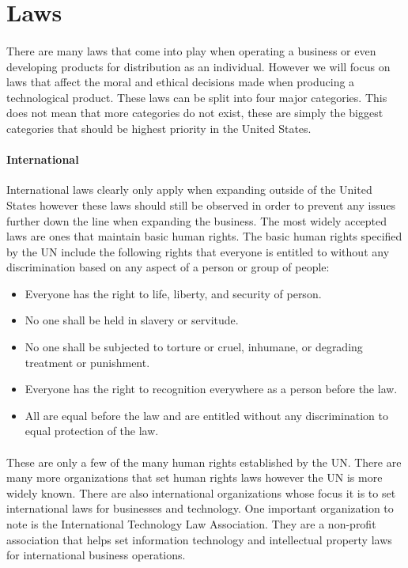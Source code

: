 \documentclass[notitlepage,a4paper,12pt]{article}
\begin{document}
\section*{Laws}
\paragraph{}There are many laws that come into play when operating a business or even developing products for distribution as an individual. However we will focus on laws that affect the moral and ethical decisions made when producing a technological product. These laws can be split into four major categories. This does not mean that more categories do not exist, these are simply the biggest categories that should be highest priority in the United States.
\paragraph{International}International laws clearly only apply when expanding outside of the United States however these laws should still be observed in order to prevent any issues further down the line when expanding the business. The most widely accepted laws are ones that maintain basic human rights. The basic human rights specified by the UN include the following rights that everyone is entitled to without any discrimination based on any aspect of a person or group of people:
	\begin{itemize}
	\item Everyone has the right to life, liberty, and security of person.
	\item No one shall be held in slavery or servitude.
	\item No one shall be subjected to torture or cruel, inhumane, or degrading treatment or punishment.
	\item Everyone has the right to recognition everywhere as a person before the law.
	\item All are equal before the law and are entitled without any discrimination to equal protection of the law.
	\end{itemize}
\paragraph{}These are only a few of the many human rights established by the UN. There are many more organizations that set human rights laws however the UN is more widely known. There are also international organizations whose focus it is to set international laws for businesses and technology. One important organization to note is the International Technology Law Association. They are a non-profit association that helps set information technology and intellectual property laws for international business operations.
\end{document}

